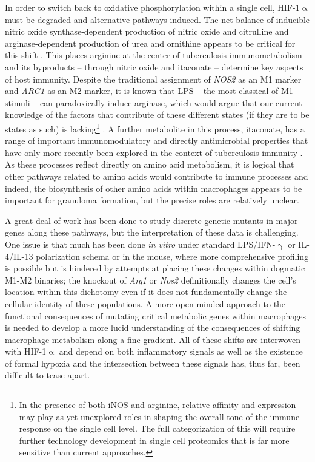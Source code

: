 In order to switch back to oxidative phosphorylation within a single cell, HIF\hyp{}1$\upalpha$ must be degraded and alternative pathways induced. The net balance of inducible nitric oxide synthase\hyp{}dependent production of nitric oxide and citrulline and arginase\hyp{}dependent production of urea and ornithine appears to be critical for this shift \citep{Palmieri2020, Qualls2016}. This places arginine at the center of tuberculosis immunometabolism and its byproducts -- through nitric oxide and itaconate -- determine key aspects of host immunity. Despite the traditional assignment of \textit{NOS2} as an M1 marker and \textit{ARG1} as an M2 marker, it is known that LPS -- the most classical of M1 stimuli -- can paradoxically induce arginase, which would argue that our current knowledge of the factors that contribute of these different states (if they are to be states as such) is lacking\footnote{In the presence of both iNOS and arginine, relative affinity and expression may play as\hyp{}yet unexplored roles in shaping the overall tone of the immune response on the single cell level. The full categorization of this will require further technology development in single cell proteomics that is far more sensitive than current approaches.} \citep{ElKasmi2008}. A further metabolite in this process, itaconate, has a range of important immunomodulatory and directly antimicrobial properties that have only more recently been explored in the context of tuberculosis immunity \citep{Jinich2022, He2021}. As these processes reflect directly on amino acid metabolism, it is logical that other pathways related to amino acids would contribute to immune processes and indeed, the biosynthesis of other amino acids within macrophages appears to be important for granuloma formation, but the precise roles are relatively unclear.

A great deal of work has been done to study discrete genetic mutants in major genes along these pathways, but the interpretation of these data is challenging. One issue is that much has been done \textit{in vitro} under standard LPS/IFN\hyp{}$\upgamma$ or IL\hyp{}4/IL\hyp{}13 polarization schema or in the mouse, where more comprehensive profiling is possible but is hindered by attempts at placing these changes within dogmatic M1\hyp{}M2 binaries; the knockout of \textit{Arg1} or \textit{Nos2} definitionally changes the cell's location within this dichotomy even if it does not fundamentally change the cellular identity of these populations. A more open\hyp{}minded approach to the functional consequences of mutating critical metabolic genes within macrophages is needed to develop a more lucid understanding of the consequences of shifting macrophage metabolism along a fine gradient. All of these shifts are interwoven with HIF\hyp{}1$\upalpha$ and depend on both inflammatory signals as well as the existence of formal hypoxia and the intersection between these signals has, thus far, been difficult to tease apart.

